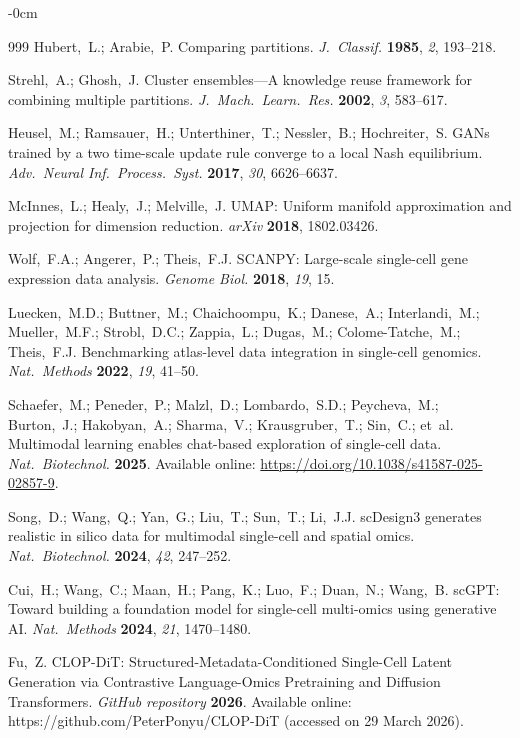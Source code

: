 \documentclass[genes,article,submit,pdftex,oneauthor]{Definitions/mdpi}
\begin{document}
\begin{adjustwidth}{-\extralength}{0cm}
\begin{thebibliography}{999}
Hubert,~L.; Arabie,~P. Comparing partitions. {\em J.\ Classif.} {\bf 1985}, {\em 2}, 193--218.

Strehl,~A.; Ghosh,~J. Cluster ensembles---A knowledge reuse framework for combining multiple partitions. {\em J.\ Mach.\ Learn.\ Res.} {\bf 2002}, {\em 3}, 583--617.

Heusel,~M.; Ramsauer,~H.; Unterthiner,~T.; Nessler,~B.; Hochreiter,~S. GANs trained by a two time-scale update rule converge to a local Nash equilibrium. {\em Adv.\ Neural Inf.\ Process.\ Syst.} {\bf 2017}, {\em 30}, 6626--6637.

McInnes,~L.; Healy,~J.; Melville,~J. UMAP: Uniform manifold approximation and projection for dimension reduction. {\em arXiv} {\bf 2018}, 1802.03426.

Wolf,~F.A.; Angerer,~P.; Theis,~F.J. SCANPY: Large-scale single-cell gene expression data analysis. {\em Genome Biol.} {\bf 2018}, {\em 19}, 15.

Luecken,~M.D.; Buttner,~M.; Chaichoompu,~K.; Danese,~A.; Interlandi,~M.; Mueller,~M.F.; Strobl,~D.C.; Zappia,~L.; Dugas,~M.; Colome-Tatche,~M.; Theis,~F.J. Benchmarking atlas-level data integration in single-cell genomics. {\em Nat.\ Methods} {\bf 2022}, {\em 19}, 41--50.

Schaefer,~M.; Peneder,~P.; Malzl,~D.; Lombardo,~S.D.; Peycheva,~M.; Burton,~J.; Hakobyan,~A.; Sharma,~V.; Krausgruber,~T.; Sin,~C.; et~al. Multimodal learning enables chat-based exploration of single-cell data. {\em Nat.\ Biotechnol.} {\bf 2025}. Available online: \url{https://doi.org/10.1038/s41587-025-02857-9}.

Song,~D.; Wang,~Q.; Yan,~G.; Liu,~T.; Sun,~T.; Li,~J.J. scDesign3 generates realistic in silico data for multimodal single-cell and spatial omics. {\em Nat.\ Biotechnol.} {\bf 2024}, {\em 42}, 247--252.

Cui,~H.; Wang,~C.; Maan,~H.; Pang,~K.; Luo,~F.; Duan,~N.; Wang,~B. scGPT: Toward building a foundation model for single-cell multi-omics using generative AI. {\em Nat.\ Methods} {\bf 2024}, {\em 21}, 1470--1480.

Fu,~Z. CLOP-DiT: Structured-Metadata-Conditioned Single-Cell Latent Generation via Contrastive Language-Omics Pretraining and Diffusion Transformers. {\em GitHub repository} {\bf 2026}. Available online: https://github.com/PeterPonyu/CLOP-DiT (accessed on 29 March 2026).


\end{thebibliography}
\end{adjustwidth}
\end{document}
